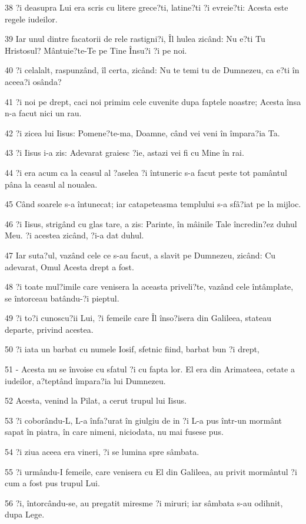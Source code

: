 \par 38 ?i deasupra Lui era scris cu litere grece?ti, latine?ti ?i evreie?ti: Acesta este regele iudeilor.
\par 39 Iar unul dintre facatorii de rele rastigni?i, Îl hulea zicând: Nu e?ti Tu Hristosul? Mântuie?te-Te pe Tine Însu?i ?i pe noi.
\par 40 ?i celalalt, raspunzând, îl certa, zicând: Nu te temi tu de Dumnezeu, ca e?ti în aceea?i osânda?
\par 41 ?i noi pe drept, caci noi primim cele cuvenite dupa faptele noastre; Acesta însa n-a facut nici un rau.
\par 42 ?i zicea lui Iisus: Pomene?te-ma, Doamne, când vei veni în împara?ia Ta.
\par 43 ?i Iisus i-a zis: Adevarat graiesc ?ie, astazi vei fi cu Mine în rai.
\par 44 ?i era acum ca la ceasul al ?aselea ?i întuneric s-a facut peste tot pamântul pâna la ceasul al noualea.
\par 45 Când soarele s-a întunecat; iar catapeteasma templului s-a sfâ?iat pe la mijloc.
\par 46 ?i Iisus, strigând cu glas tare, a zis: Parinte, în mâinile Tale încredin?ez duhul Meu. ?i acestea zicând, ?i-a dat duhul.
\par 47 Iar suta?ul, vazând cele ce s-au facut, a slavit pe Dumnezeu, zicând: Cu adevarat, Omul Acesta drept a fost.
\par 48 ?i toate mul?imile care venisera la aceasta priveli?te, vazând cele întâmplate, se întorceau batându-?i pieptul.
\par 49 ?i to?i cunoscu?ii Lui, ?i femeile care Îl înso?isera din Galileea, stateau departe, privind acestea.
\par 50 ?i iata un barbat cu numele Iosif, sfetnic fiind, barbat bun ?i drept,
\par 51 - Acesta nu se învoise cu sfatul ?i cu fapta lor. El era din Arimateea, cetate a iudeilor, a?teptând împara?ia lui Dumnezeu.
\par 52 Acesta, venind la Pilat, a cerut trupul lui Iisus.
\par 53 ?i coborându-L, L-a înfa?urat în giulgiu de in ?i L-a pus într-un mormânt sapat în piatra, în care nimeni, niciodata, nu mai fusese pus.
\par 54 ?i ziua aceea era vineri, ?i se lumina spre sâmbata.
\par 55 ?i urmându-I femeile, care venisera cu El din Galileea, au privit mormântul ?i cum a fost pus trupul Lui.
\par 56 ?i, întorcându-se, au pregatit miresme ?i miruri; iar sâmbata s-au odihnit, dupa Lege.

